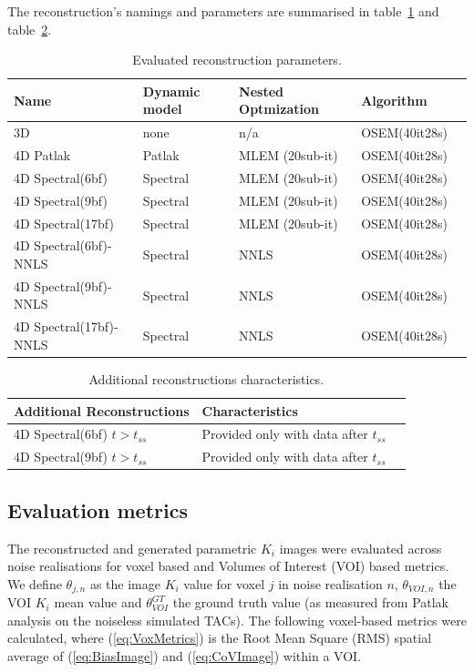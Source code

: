 The reconstruction's namings and parameters are summarised in table~\ref{tab:ReconstructionNames} and table~\ref{tab:ReconstructionNamesTss}.

\begin{table}[ht!]
\caption{\label{tab:ReconstructionNames}Evaluated reconstruction parameters.}
\begin{tabular}{lllll}
\toprule
\textbf{Name} & \textbf{Dynamic model} & \textbf{Nested Optmization} & \textbf{Algorithm}  \\
\midrule
3D                   & none     & n/a              & OSEM(40it28s) \\
4D Patlak            & Patlak   & MLEM (20sub-it)  & OSEM(40it28s) \\
4D Spectral(6bf)     & Spectral & MLEM (20sub-it)  & OSEM(40it28s) \\
4D Spectral(9bf)     & Spectral & MLEM (20sub-it)  & OSEM(40it28s) \\
4D Spectral(17bf)    & Spectral & MLEM (20sub-it)  & OSEM(40it28s) \\
4D Spectral(6bf)-NNLS & Spectral & NNLS            & OSEM(40it28s) \\
4D Spectral(9bf)-NNLS & Spectral & NNLS            & OSEM(40it28s) \\
4D Spectral(17bf)-NNLS & Spectral & NNLS            & OSEM(40it28s) \\
\toprule
\end{tabular}
\end{table}

\begin{table}[ht!]
\caption{\label{tab:ReconstructionNamesTss}Additional reconstructions characteristics.}
\begin{tabular}{lll}
\toprule
\textbf{Additional Reconstructions} & \textbf{Characteristics}  \\
\midrule
4D Spectral(6bf) $t>t_{ss}$ & Provided only with data after $t_{ss}$  & \\
4D Spectral(9bf) $t>t_{ss}$ & Provided only with data after $t_{ss}$  & \\
\toprule
\end{tabular}
\end{table}

\subsection{Evaluation metrics}
The reconstructed and generated parametric $K_i$ images were evaluated across noise realisations for voxel based and Volumes of Interest (VOI) based metrics. We define $\theta_{j,n}$ as the image $K_i$ value for voxel $j$ in noise realisation $n$, $\theta_{VOI,n}$ the VOI $K_i$ mean value and $\theta_{VOI}^{GT}$ the ground truth value (as measured from Patlak analysis on the noiseless simulated TACs). The following voxel-based metrics were calculated, where (\ref{eq:VoxMetrics}) is the Root Mean Square (RMS) spatial average of (\ref{eq:BiasImage}) and (\ref{eq:CoVImage}) within a VOI.

